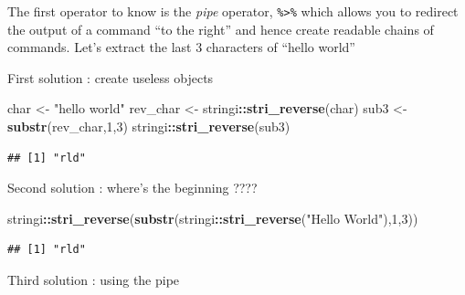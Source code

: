 \documentclass[
]{book}
\newenvironment{Shaded}{\begin{snugshade}}{\end{snugshade}}
\newcommand{\DecValTok}[1]{\textcolor[rgb]{0.00,0.00,0.81}{#1}}
\newcommand{\KeywordTok}[1]{\textcolor[rgb]{0.13,0.29,0.53}{\textbf{#1}}}
\newcommand{\NormalTok}[1]{#1}
\newcommand{\OperatorTok}[1]{\textcolor[rgb]{0.81,0.36,0.00}{\textbf{#1}}}
\newcommand{\StringTok}[1]{\textcolor[rgb]{0.31,0.60,0.02}{#1}}
\begin{document}
The first operator to know is the \emph{pipe} operator, \texttt{\%\textgreater{}\%} which allows you to redirect the output of a command ``to the right'' and hence create readable chains of commands.
Let's extract the last 3 characters of ``hello world''

First solution : create useless objects

\begin{Shaded}
\begin{Highlighting}[]
\NormalTok{char <-}\StringTok{ "hello world"}
\NormalTok{rev_char <-}\StringTok{ }\NormalTok{stringi}\OperatorTok{::}\KeywordTok{stri_reverse}\NormalTok{(char)}
\NormalTok{sub3 <-}\StringTok{ }\KeywordTok{substr}\NormalTok{(rev_char,}\DecValTok{1}\NormalTok{,}\DecValTok{3}\NormalTok{)}
\NormalTok{stringi}\OperatorTok{::}\KeywordTok{stri_reverse}\NormalTok{(sub3)}
\end{Highlighting}
\end{Shaded}

\begin{verbatim}
## [1] "rld"
\end{verbatim}

Second solution : where's the beginning ????

\begin{Shaded}
\begin{Highlighting}[]
\NormalTok{stringi}\OperatorTok{::}\KeywordTok{stri_reverse}\NormalTok{(}\KeywordTok{substr}\NormalTok{(stringi}\OperatorTok{::}\KeywordTok{stri_reverse}\NormalTok{(}\StringTok{"Hello World"}\NormalTok{),}\DecValTok{1}\NormalTok{,}\DecValTok{3}\NormalTok{))}
\end{Highlighting}
\end{Shaded}

\begin{verbatim}
## [1] "rld"
\end{verbatim}

Third solution : using the pipe

\begin{Shaded}
\end{Shaded}
\end{document}
